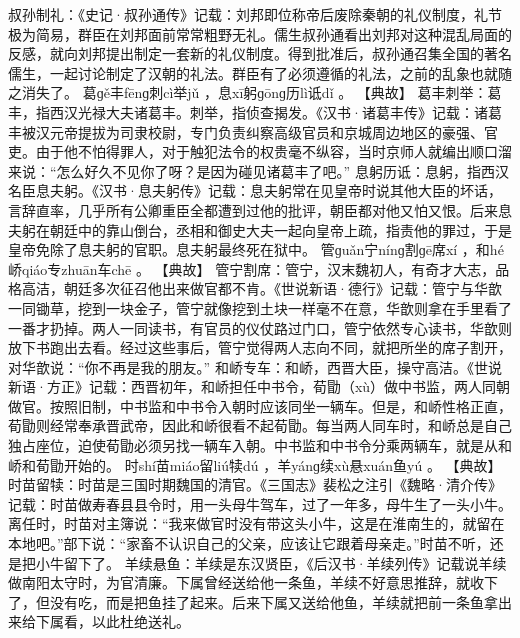 \documentclass[12pt,UTF8]{ctexbook}
\begin{document}
叔孙制礼：《史记·叔孙通传》记载：刘邦即位称帝后废除秦朝的礼仪制度，礼节极为简易，群臣在刘邦面前常常粗野无礼。儒生叔孙通看出刘邦对这种混乱局面的反感，就向刘邦提出制定一套新的礼仪制度。得到批准后，叔孙通召集全国的著名儒生，一起讨论制定了汉朝的礼法。群臣有了必须遵循的礼法，之前的乱象也就随之消失了。
葛ɡě丰fēnɡ刺cì举jǔ
，息xī躬ɡōnɡ历lì诋dǐ
。
【典故】
葛丰刺举：葛丰，指西汉光禄大夫诸葛丰。刺举，指侦查揭发。《汉书·诸葛丰传》记载：诸葛丰被汉元帝提拔为司隶校尉，专门负责纠察高级官员和京城周边地区的豪强、官吏。由于他不怕得罪人，对于触犯法令的权贵毫不纵容，当时京师人就编出顺口溜来说：“怎么好久不见你了呀？是因为碰见诸葛丰了吧。”
息躬历诋：息躬，指西汉名臣息夫躬。《汉书·息夫躬传》记载：息夫躬常在见皇帝时说其他大臣的坏话，言辞直率，几乎所有公卿重臣全都遭到过他的批评，朝臣都对他又怕又恨。后来息夫躬在朝廷中的靠山倒台，丞相和御史大夫一起向皇帝上疏，指责他的罪过，于是皇帝免除了息夫躬的官职。息夫躬最终死在狱中。
管ɡuǎn宁nínɡ割ɡē席xí
，和hé峤qiáo专zhuān车chē
。
【典故】
管宁割席：管宁，汉末魏初人，有奇才大志，品格高洁，朝廷多次征召他出来做官都不肯。《世说新语·德行》记载：管宁与华歆一同锄草，挖到一块金子，管宁就像挖到土块一样毫不在意，华歆则拿在手里看了一番才扔掉。两人一同读书，有官员的仪仗路过门口，管宁依然专心读书，华歆则放下书跑出去看。经过这些事后，管宁觉得两人志向不同，就把所坐的席子割开，对华歆说：“你不再是我的朋友。”
和峤专车：和峤，西晋大臣，操守高洁。《世说新语·方正》记载：西晋初年，和峤担任中书令，荀勖（xù）做中书监，两人同朝做官。按照旧制，中书监和中书令入朝时应该同坐一辆车。但是，和峤性格正直，荀勖则经常奉承晋武帝，因此和峤很看不起荀勖。每当两人同车时，和峤总是自己独占座位，迫使荀勖必须另找一辆车入朝。中书监和中书令分乘两辆车，就是从和峤和荀勖开始的。
时shí苗miáo留liú犊dú
，羊yánɡ续xù悬xuán鱼yú
。
【典故】
时苗留犊：时苗是三国时期魏国的清官。《三国志》裴松之注引《魏略·清介传》记载：时苗做寿春县县令时，用一头母牛驾车，过了一年多，母牛生了一头小牛。离任时，时苗对主簿说：“我来做官时没有带这头小牛，这是在淮南生的，就留在本地吧。”部下说：“家畜不认识自己的父亲，应该让它跟着母亲走。”时苗不听，还是把小牛留下了。
羊续悬鱼：羊续是东汉贤臣，《后汉书·羊续列传》记载说羊续做南阳太守时，为官清廉。下属曾经送给他一条鱼，羊续不好意思推辞，就收下了，但没有吃，而是把鱼挂了起来。后来下属又送给他鱼，羊续就把前一条鱼拿出来给下属看，以此杜绝送礼。
\end{document}
